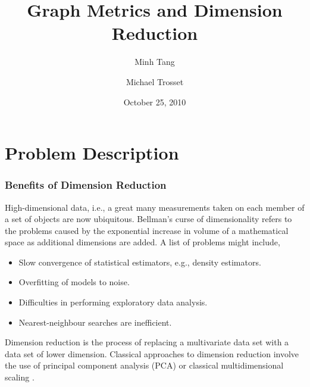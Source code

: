 \documentclass[professionalfonts, hyperref={pdfpagelabels=false,
  colorlinks=true, linkcolor=purple}]{beamer}
\begin{document}
\title[Graph Metrics and Dimension Reduction]{Graph Metrics and
  Dimension Reduction}
\author[Tang \& Trosset]{Minh Tang \and Michael
  Trosset}

\date{October 25, 2010}

\begin{frame}
\titlepage
\end{frame}
\section{Problem Description}
\begin{frame}
  \frametitle{Benefits of Dimension Reduction}
  High-dimensional data, i.e., a great many measurements taken on each
  member of a set of objects are now ubiquitous. Bellman's
  \alert{curse of dimensionality} \cite{bellman57:_dynam} refers to
  the problems caused by the exponential increase in volume of a
  mathematical space as additional dimensions are added. A list of
  problems might include,
  
  \begin{itemize}
  \item Slow convergence of statistical estimators, e.g., density
    estimators. 
  \item Overfitting of models to noise.
  \item Difficulties in performing exploratory data analysis.
  \item Nearest-neighbour searches are inefficient.
  \end{itemize}
  
  Dimension reduction is the process of replacing a
  multivariate data set with a data set of lower dimension. Classical
  approaches to dimension reduction involve the use of principal
  component analysis (PCA) \cite{pearson01:_on,hotelling33:_analy}
  or classical multidimensional scaling \cite{torgesen52:_multid,gower66:_some}.
\end{frame}
\end{document}
